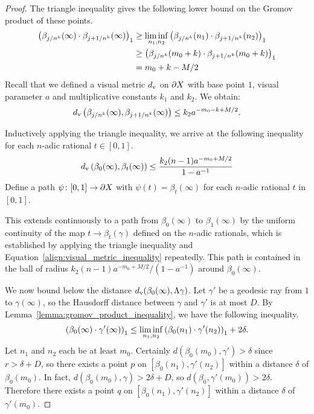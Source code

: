 \begin{proof}
  The triangle inequality gives the following lower bound on the Gromov product of these points.
  \begin{align}
    \gromprod[1]{\beta_{j/n^k}(\infty)}{\beta_{j+1/n^k}(\infty)} & \geq \liminf_{n_1,n_2}\gromprod[1]{\beta_{j/n^k}(n_1)}{\beta_{j+1/n^k}(n_2)}\\
                                                                 & \geq \gromprod[1]{\beta_{j/n^k}(m_0 + k)}{\beta_{j+1/n^k}(m_0 + k)}\\
                                                                 & = m_0 + k - M/2
  \end{align}
  Recall that we defined a visual metric $d_\rmv$ on $\boundary X$ with base point $1$, visual parameter $a$ and multiplicative constants $k_1$ and $k_2$. 
  We obtain:
  \begin{align}\label{align:visual_metric_inequality}
    d_\rmv\left(\beta_{j/n^k}(\infty), \beta_{j+1/n^k}(\infty)\right) \leq k_2a^{-m_0 - k + M/2}.
  \end{align}

  Inductively applying the triangle inequality, we arrive at the following inequality for each $n$-adic rational $t \in [0,1]$.
  \begin{align}
    d_\rmv\left(\beta_0(\infty), \beta_t(\infty)\right) \leq \frac{k_2(n-1)a^{-m_0 + M/2}}{1-a^{-1}}
  \end{align}
  Define a path $\psi \colon [0,1] \to \boundary X$ with $\psi(t) = \beta_t(\infty)$ for each $n$-adic rational $t$ in $[0, 1]$. 

  This extends continuously to a path from $\beta_0(\infty)$ to $\beta_1(\infty)$ by the uniform continuity of the map $t \to \beta_t(\gamma)$ defined on the $n$-adic rationals, which is established by applying the triangle inequality and Equation~\ref{align:visual_metric_inequality} repeatedly.
  This path is contained in the ball of radius $k_2(n-1)a^{-m_0 + M/2}/(1-a^{-1})$ around $\beta_0(\infty)$.

  We now bound below the distance $d_\rmv(\beta_0(\infty), \Lambda\gamma)$. 
  Let $\gamma'$ be a geodesic ray from $1$ to $\gamma(\infty)$, so the Hausdorff distance between $\gamma$ and $\gamma'$ is at most $D$.  
  By Lemma~\ref{lemma:gromov_product_inequality}, we have the following inequality.
  \begin{align}
    \gromprod[1]{\beta_0(\infty)}{\gamma'(\infty)} \leq \liminf_{n_1,n_2}\gromprod[1]{\beta_0(n_1)}{\gamma'(n_2)} + 2\delta.
  \end{align}
  Let $n_1$ and $n_2$ each be at least $m_0$. 
  Certainly $d(\beta_0(m_0), \gamma') > \delta$ since $r > \delta + D$, so there exists a point $p$ on $[\beta_0(n_1), \gamma'(n_2)]$ within a distance $\delta$ of $\beta_0(m_0)$. 
  In fact, $d(\beta_0(m_0), \gamma) > 2\delta + D$, so $d(\beta_0, \gamma'(m_0)) > 2\delta$. 
  Therefore there exists a point $q$ on $[\beta_0(n_1), \gamma'(n_2)]$ within a distance $\delta$ of $\gamma'(m_0)$. 


\end{proof}
